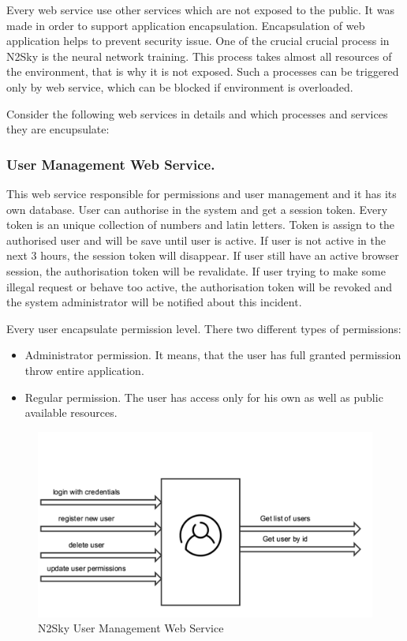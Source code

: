 Every web service use other services which are not exposed to the public. It was made in order to support application encapsulation. Encapsulation of web application helps to prevent security issue. One of the crucial crucial process in N2Sky is the neural network training. This process takes almost all resources of the environment, that is why it is not exposed. Such a processes can be triggered only by web service, which can be blocked if environment is overloaded.

Consider the following web services in details and which processes and services they are encupsulate:  


\subsubsection{User Management Web Service.}\label{User Management Web Service}   This web service responsible for permissions and user management and it has its own database. User can authorise in the system and get a session token. Every token is an unique collection of numbers and latin letters. Token is assign to the authorised user and will be save until user is active. If user is not active in the next 3 hours, the session token will disappear. If user still have an active browser session, the authorisation token will be revalidate. If user trying to make some illegal request or behave too active, the authorisation token will be revoked and the system administrator will be notified about this incident. 

Every user encapsulate permission level. There two different types of permissions:
\begin{itemize}
\item Administrator permission. It means, that the user has full granted permission throw entire application.
\item Regular permission. The user has access only for his own as well as public available resources.  
\end{itemize}

 \begin{figure}[htbp]
\begin{center}
  \includegraphics[width=\linewidth]{components/3/components/user_serivice.png}
  \caption{N2Sky User Management Web Service}
  \label{fig:user_serivice}
\end{center}
\end{figure}

